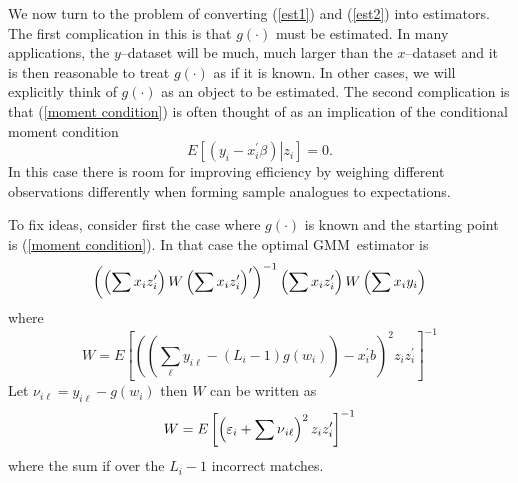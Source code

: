 \documentclass[12pt]{article}
\begin{document}
We now turn to the problem of converting (\ref{est1}) and (\ref{est2}) into
estimators. The first complication in this is that $g\left( \cdot \right) $
must be estimated. In many applications, the $y$--dataset will be much, much
larger than the $x$--dataset and it is then reasonable to treat $g\left(
\cdot \right) $ as if it is known. In other cases, we will explicitly think
of $g\left( \cdot \right) $ as an object to be estimated. The second
complication is that (\ref{moment condition}) is often thought of as an
implication of the conditional moment condition
\begin{equation}
E\left[ \left. \left( y_{i}-x_{i}^{\prime }\beta \right) \right\vert z_{i}%
\right] =0.  \label{cond moment}
\end{equation}%
In this case there is room for improving efficiency by weighing different
observations differently when forming sample analogues to expectations.

To fix ideas, consider first the case where $g\left( \cdot \right) $ is
known and the starting point is (\ref{moment condition}). In that case the
optimal GMM\ estimator is
\begin{equation*}
\left( \left( \mathop{\displaystyle \sum } x_{i}z_{i}^{\prime }\right) W\left( \mathop{\displaystyle \sum }
x_{i}z_{i}^{\prime }\right) ^{\prime }\right) ^{-1}\left( \mathop{\displaystyle \sum }
x_{i}z_{i}^{\prime }\right) W\left( \mathop{\displaystyle \sum } x_{i}y_{i}\right)
\end{equation*}%
where%
\begin{equation*}
W=E\left[ \left( \left( \sum_{\ell }y_{i\ell }-\left( L_{i}-1\right) g\left(
w_{i}\right) \right) -x_{i}^{\prime }b\right) ^{2}z_{i}z_{i}^{\prime }\right]
^{-1}
\end{equation*}%
Let $\nu _{i\ell }=y_{i\ell }-g\left( w_{i}\right) $ then $W$ can be written
as%
\begin{equation*}
W=E\left[ \left( \varepsilon _{i}+\dsum \nu _{i\ell }\right)
^{2}z_{i}z_{i}^{\prime }\right] ^{-1}
\end{equation*}%
where the sum if over the $L_{i}-1$ incorrect matches.
\end{document}
